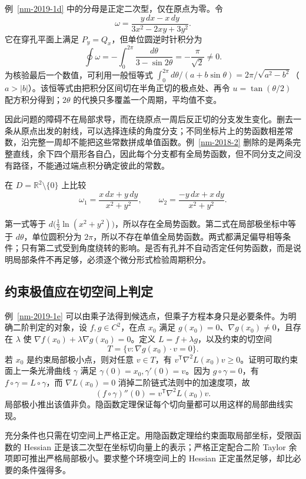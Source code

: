 \documentclass[UTF8,12pt,a4paper,fontset=fandol]{ctexart}
\begin{document}
例~\ref{nm-2019-1d} 中的分母是正定二次型，仅在原点为零。令
\[
 \omega=\frac{y\,dx-x\,dy}{3x^2-2xy+3y^2}.
\]
它在穿孔平面上满足 $P_y=Q_x$，但单位圆逆时针积分为
\[
 \oint\omega=-\int_0^{2\pi}\frac{d\theta}{3-\sin2\theta}
 =-\frac\pi{\sqrt2}\ne0.
\]
为核验最后一个数值，可利用一般恒等式 $\int_0^{2\pi}d\theta/(a+b\sin\theta)=2\pi/\sqrt{a^2-b^2}$（$a>|b|$）。该恒等式由把积分区间切在半角正切的极点处、再令 $u=\tan(\theta/2)$ 配方积分得到；$2\theta$ 的代换只多覆盖一个周期，平均值不变。

因此问题的障碍不在局部求导，而在绕原点一周后反正切的分支发生变化。删去一条从原点出发的射线，可以选择连续的角度分支；不同坐标片上的势函数相差常数，沿完整一周却不能把这些常数拼成单值函数。例~\ref{nm-2018-2} 删除的是两条完整直线，余下四个扇形各自凸，因此每个分支都有全局势函数，但不同分支之间没有路径，不能通过端点积分确定彼此的常数。

\begin{example}
在 $D=\mathbb R^2\setminus\{0\}$ 上比较
\[
 \omega_1=\frac{x\,dx+y\,dy}{x^2+y^2},\qquad
 \omega_2=\frac{-y\,dx+x\,dy}{x^2+y^2}.
\]
\end{example}
\begin{solve}
第一式等于 $d\bigl(\tfrac12\ln(x^2+y^2)\bigr)$，所以存在全局势函数。第二式在局部极坐标中等于 $d\theta$，单位圆积分为 $2\pi$，所以不存在单值全局势函数。两式都满足偏导相等条件；只有第二式受到角度绕转的影响。是否有孔并不自动否定任何势函数，而是说明局部条件不再足够，必须逐个微分形式检验周期积分。
\end{solve}

\subsection{约束极值应在切空间上判定}
例~\ref{nm-2019-1e} 可以由乘子法得到候选点，但乘子方程本身只是必要条件。为明确二阶判定的对象，设 $f,g\in C^2$，在点 $x_0$ 满足 $g(x_0)=0$、$\nabla g(x_0)\ne0$，且存在 $\lambda$ 使 $\nabla f(x_0)+\lambda\nabla g(x_0)=0$。定义 $L=f+\lambda g$，以及约束的切空间
\[
 T=\{v:\nabla g(x_0)\cdot v=0\}.
\]
若 $x_0$ 是约束局部极小点，则对任意 $v\in T$，有 $v^{\mathsf T}\nabla^2L(x_0)v\geq0$。证明可取约束面上一条光滑曲线 $\gamma$ 满足 $\gamma(0)=x_0,\gamma'(0)=v$。因为 $g\circ\gamma=0$，有 $f\circ\gamma=L\circ\gamma$，而 $\nabla L(x_0)=0$ 消掉二阶链式法则中的加速度项，故
\[
 (f\circ\gamma)''(0)=v^{\mathsf T}\nabla^2L(x_0)v.
\]
局部极小推出该值非负。隐函数定理保证每个切向量都可以用这样的局部曲线实现。

充分条件也只需在切空间上严格正定。用隐函数定理给约束面取局部坐标，受限函数的 Hessian 正是该二次型在坐标切向量上的表示；严格正定配合二阶 Taylor 余项即可推出严格局部极小。要求整个环境空间上的 Hessian 正定虽然足够，却比必要的条件强得多。
\end{document}
